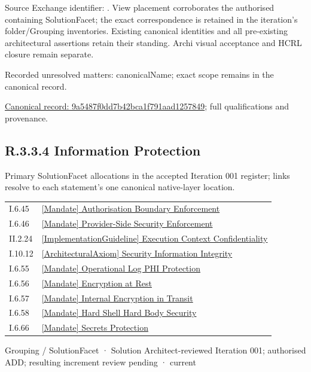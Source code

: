 Source Exchange identifier: \texttt{}. View placement corroborates
the authorised containing SolutionFacet; the exact correspondence is retained in the
iteration's folder/Grouping inventories. Existing canonical identities and all
pre-existing architectural assertions retain their standing. Archi visual
acceptance and HCRL closure remain separate.


{\small Recorded unresolved matters: canonicalName; exact scope remains in the canonical record.}\par
{\footnotesize \href{../../../../../../../continuum/grouping/9a5487f0dd7b42bca1f791aad1257849.md}{Canonical record: 9a5487f0dd7b42bca1f791aad1257849}; full qualifications and provenance.}\par
\subsection*{R.3.3.4 Information Protection}
\label{navigation:R.3.3.4}

Primary SolutionFacet allocations in the accepted Iteration 001 register; links resolve to each statement’s one canonical native-layer location.\par
\begin{longtable}{p{.22\linewidth}p{.73\linewidth}}
I.6.45 & \hyperref[element:e04672ef7f2341b68c09a0348742a861]{[Mandate] Authorisation Boundary Enforcement} \\
I.6.46 & \hyperref[element:d93b50d0abe04c47bf09759627785745]{[Mandate] Provider-Side Security Enforcement} \\
II.2.24 & \hyperref[element:ddc28f789d69433686ef40561fec5750]{[ImplementationGuideline] Execution Context Confidentiality} \\
I.10.12 & \hyperref[element:52083b57c01d4262bf965afa96489136]{[ArchitecturalAxiom] Security Information Integrity} \\
I.6.55 & \hyperref[element:ab99a48c29c14a1883e820baf98b643a]{[Mandate] Operational Log PHI Protection} \\
I.6.56 & \hyperref[element:4522bf0326334607a4a6177c819e61b6]{[Mandate] Encryption at Rest} \\
I.6.57 & \hyperref[element:4b540b55db1b4c1197482d8f29d70e45]{[Mandate] Internal Encryption in Transit} \\
I.6.58 & \hyperref[element:fb7783088c894106a017912467a9e40d]{[Mandate] Hard Shell Hard Body Security} \\
I.6.66 & \hyperref[element:4547bd339ff143c988391159e3407f20]{[Mandate] Secrets Protection} \\
\end{longtable}
\label{element:d2f8fcaac9984a12beab502d1944ea25}
{\small Grouping / SolutionFacet · Solution Architect-reviewed Iteration 001; authorised ADD; resulting increment review pending · current}\par

